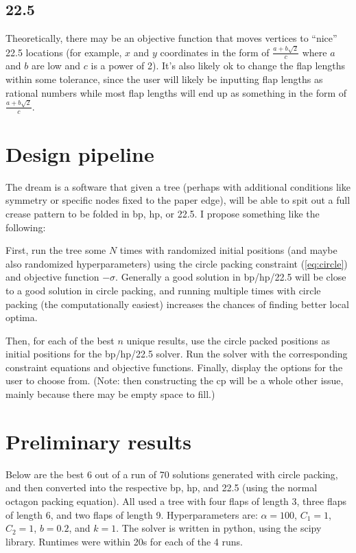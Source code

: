 \documentclass[12pt]{article}
\begin{document}
\subsection{22.5}
Theoretically, there may be an objective function that moves vertices to ``nice'' 22.5 locations (for example, $x$ and $y$ coordinates in the form of $\frac{a+b\sqrt2}{c}$ where $a$ and $b$ are low and $c$ is a power of 2). It's also likely ok to change the flap lengths within some tolerance, since the user will likely be inputting flap lengths as rational numbers while most flap lengths will end up as something in the form of $\frac{a+b\sqrt2}{c}$.

\section{Design pipeline}
The dream is a software that given a tree (perhaps with additional conditions like symmetry or specific nodes fixed to the paper edge), will be able to spit out a full crease pattern to be folded in bp, hp, or 22.5. I propose something like the following:

First, run the tree some $N$ times with randomized initial positions (and maybe also randomized hyperparameters) using the circle packing constraint (\ref{eq:circle}) and objective function $-\sigma$. Generally a good solution in bp/hp/22.5 will be close to a good solution in circle packing, and running multiple times with circle packing (the computationally easiest) increases the chances of finding better local optima. 

Then, for each of the best $n$ unique results, use the circle packed positions as initial positions for the bp/hp/22.5 solver. Run the solver with the corresponding constraint equations and objective functions. Finally, display the options for the user to choose from. (Note: then constructing the cp will be a whole other issue, mainly because there may be empty space to fill.)

\section{Preliminary results}
Below are the best 6 out of a run of 70 solutions generated with circle packing, and then converted into the respective bp, hp, and 22.5 (using the normal octagon packing equation). All used a tree with four flaps of length 3, three flaps of length 6, and two flaps of length 9. Hyperparameters are: $\alpha=100$, $C_1=1$, $C_2=1$, $b=0.2$, and $k=1$. The solver is written in python, using the scipy library. Runtimes were within 20s for each of the 4 runs.
\end{document}
